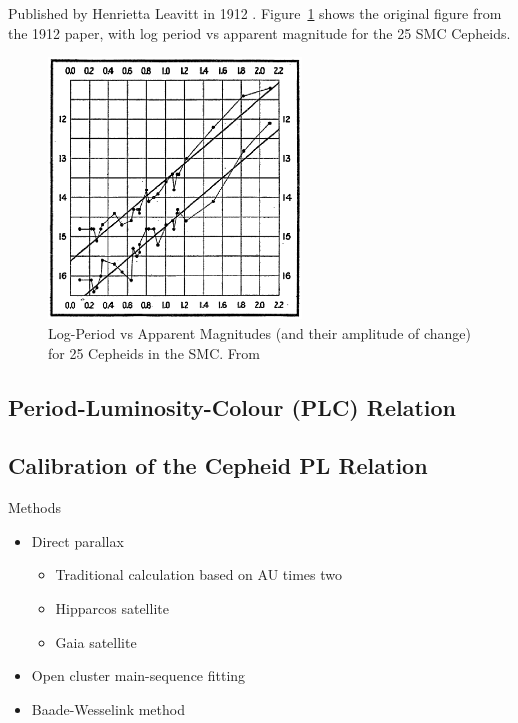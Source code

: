 \documentclass{spy}
\begin{document}
Published by Henrietta Leavitt in 1912 \citep{leavittPeriods25Variable1912}. Figure~\ref{leavitt_period_luminosity_diagram} shows the original figure from the 1912 paper, with log period vs apparent magnitude for the 25 SMC Cepheids.

\begin{figure}[ht]
    \centering
    \includegraphics[width=0.6\textwidth]{leavitt_period_luminosity.eps}
    \caption{Log-Period vs Apparent Magnitudes (and their amplitude of change) for 25 Cepheids in the SMC. From \citet{leavittPeriods25Variable1912}}    \label{leavitt_period_luminosity_diagram}
\end{figure}

\subsection{Period-Luminosity-Colour (PLC) Relation}

\subsection{Calibration of the Cepheid PL Relation}
Methods
\begin{itemize}
    \item Direct parallax
        \begin{itemize}
        \item Traditional calculation based on AU times two
        \item Hipparcos satellite
        \item Gaia satellite
        \end{itemize}
    \item Open cluster main-sequence fitting
    \item Baade-Wesselink method
\end{itemize}
\end{document}
